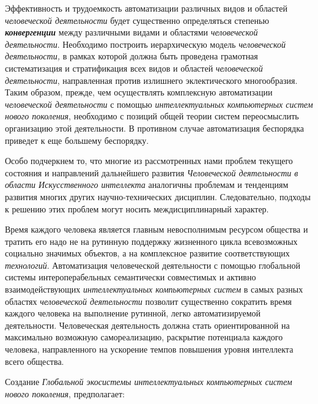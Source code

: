 Эффективность и трудоемкость автоматизации различных видов и областей \textit{человеческой деятельности} будет существенно определяться степенью \textbf{\textit{конвергенции}} между различными видами и областями \textit{человеческой деятельности}. Необходимо построить иерархическую модель \textit{человеческой деятельности,} в рамках которой должна быть проведена грамотная систематизация и стратификация всех видов и областей \textit{человеческой деятельности}, направленная против излишнего эклектического многообразия. Таким образом, прежде, чем осуществлять комплексную автоматизации \textit{человеческой деятельности} с помощью \textit{интеллектуальных компьютерных систем} \textit{нового поколения}, необходимо с позиций общей теории систем переосмыслить организацию этой деятельности. В противном случае автоматизация беспорядка приведет к еще большему беспорядку.

Особо подчеркнем то, что многие из рассмотренных нами проблем текущего состояния и направлений дальнейшего развития \textit{Человеческой деятельности в области Искусственного интеллекта} аналогичны проблемам и тенденциям развития многих других научно-технических дисциплин. Следовательно, подходы к решению этих проблем могут носить междисциплинарный характер.

Время каждого человека является главным невосполнимым ресурсом общества и тратить его надо не на рутинную поддержку жизненного цикла всевозможных социально значимых объектов, а на комплексное развитие соответствующих \textit{технологий}. Автоматизация человеческой деятельности с помощью глобальной системы интероперабельных семантически совместимых и активно взаимодействующих \textit{интеллектуальных компьютерных систем} в самых разных областях \textit{человеческой деятельности} позволит существенно сократить время каждого человека на выполнение рутинной, легко автоматизируемой деятельности. Человеческая деятельность должна стать ориентированной на максимально возможную самореализацию, раскрытие  потенциала каждого человека, направленного на ускорение темпов повышения уровня интеллекта всего общества.

Создание \textit{Глобальной экосистемы интеллектуальных компьютерных систем нового поколения}, предполагает:

